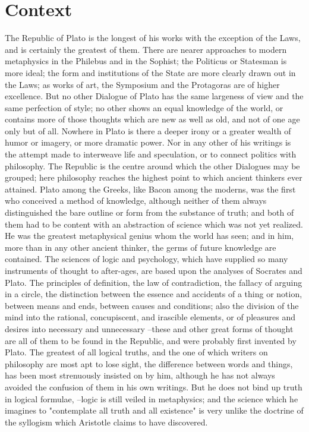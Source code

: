 \section{Context}

The Republic of Plato is the longest of his works with the exception of the Laws, and is certainly the greatest of them. There are nearer approaches to modern metaphysics in the Philebus and in the Sophist; the Politicus or Statesman is more ideal; the form and institutions of the State are more clearly drawn out in the Laws; as works of art, the Symposium and the Protagoras are of higher excellence. But no other Dialogue of Plato has the same largeness of view and the same perfection of style; no other shows an equal knowledge of the world, or contains more of those thoughts which are new as well as old, and not of one age only but of all. Nowhere in Plato is there a deeper irony or a greater wealth of humor or imagery, or more dramatic power. Nor in any other of his writings is the attempt made to interweave life and speculation, or to connect politics with philosophy. The Republic is the centre around which the other Dialogues may be grouped; here philosophy reaches the highest point to which ancient thinkers ever attained. Plato among the Greeks, like Bacon among the moderns, was the first who conceived a method of knowledge, although neither of them always distinguished the bare outline or form from the substance of truth; and both of them had to be content with an abstraction of science which was not yet realized. He was the greatest metaphysical genius whom the world has seen; and in him, more than in any other ancient thinker, the germs of future knowledge are contained. The sciences of logic and psychology, which have supplied so many instruments of thought to after-ages, are based upon the analyses of Socrates and Plato. The principles of definition, the law of contradiction, the fallacy of arguing in a circle, the distinction between the essence and accidents of a thing or notion, between means and ends, between causes and conditions; also the division of the mind into the rational, concupiscent, and irascible elements, or of pleasures and desires into necessary and unnecessary --these and other great forms of thought are all of them to be found in the Republic, and were probably first invented by Plato. The greatest of all logical truths, and the one of which writers on philosophy are most apt to lose sight, the difference between words and things, has been most strenuously insisted on by him, although he has not always avoided the confusion of them in his own writings. But he does not bind up truth in logical formulae, --logic is still veiled in metaphysics; and the science which he imagines to "contemplate all truth and all existence" is very unlike the doctrine of the syllogism which Aristotle claims to have discovered.

